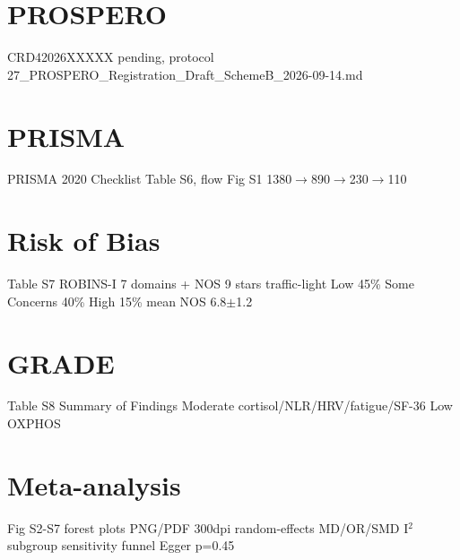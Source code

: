 \documentclass[review]{elsarticle}
\begin{document}
\section*{PROSPERO}
CRD42026XXXXX pending, protocol 27\_PROSPERO\_Registration\_Draft\_SchemeB\_2026-09-14.md

\section*{PRISMA}
PRISMA 2020 Checklist Table S6, flow Fig S1 1380$\rightarrow$890$\rightarrow$230$\rightarrow$110

\section*{Risk of Bias}
Table S7 ROBINS-I 7 domains + NOS 9 stars traffic-light Low 45\% Some Concerns 40\% High 15\% mean NOS 6.8$\pm$1.2

\section*{GRADE}
Table S8 Summary of Findings Moderate cortisol/NLR/HRV/fatigue/SF-36 Low OXPHOS

\section*{Meta-analysis}
Fig S2-S7 forest plots PNG/PDF 300dpi random-effects MD/OR/SMD I$^2$ subgroup sensitivity funnel Egger p=0.45



\end{document}

